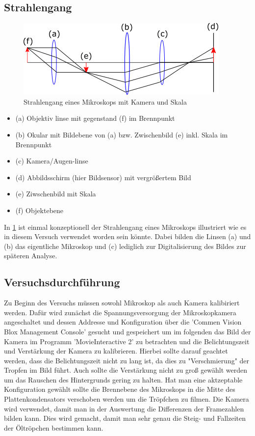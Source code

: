 \documentclass{scrartcl}
\begin{document}
	\subsection{Strahlengang}
		\begin{figure}[H]
            \centering
            \includegraphics[width=.5\textwidth]{mikroskop.png} 
			\caption{Strahlengang eines Mikroskops mit Kamera und Skala}
			\label{Mikroskop}  
        \end{figure}
        \begin{itemize}
            \item (a) Objektiv linse mit gegenstand (f) im Brennpunkt
            \item (b) Okular mit Bildebene von (a) bzw. Zwischenbild (e) inkl. Skala im Brennpunkt
            \item (c) Kamera/Augen-linse
            \item (d) Abbildsschirm (hier Bildsensor) mit vergrößertem Bild
            \item (e) Ziwschenbild mit Skala
            \item (f) Objektebene
        \end{itemize}
        In \ref{Mikroskop} ist einmal konzeptionell der Strahlengang eines Mikroskops illustriert wie es in diesem
        Versuch verwendet worden sein könnte. Dabei bilden die Linsen (a) und (b) das eigentliche Mikroskop und (c)
        lediglich zur Digitalisierung des Bildes zur späteren Analyse.

	\subsection{Versuchsdurchführung}
		Zu Beginn des Versuchs müssen sowohl Mikroskop als auch Kamera kalibiriert werden. Dafür wird zunächst die
		Spannungsversorgung der Mikroskopkamera angeschaltet und dessen Addresse und Konfiguration über die 'Commen Vision Blox Management Console'
		gesucht und gespeichert um im folgenden das Bild der Kamera im Programm 'MovieInteractive 2' zu betrachten
		und die Belichtungszeit und Verstärkung der Kamera zu kalibrieren. Hierbei sollte darauf geachtet werden, dass die 
		Belichtungszeit nicht zu lang ist, da dies zu "Verschmierung" der Tropfen im Bild führt. Auch sollte 
		die Verstärkung nicht zu groß gewählt werden um das Rauschen des Hintergrunds gering zu halten. Hat man 
		eine aktzeptable Konfiguration gewählt sollte die Brennebene des Mikroskops in die Mitte des Plattenkondensators
		verschoben werden um die Tröpfchen zu filmen. Die Kamera wird verwendet, damit man in der Auswertung die Differenzen
        der Framezahlen bilden kann. Dies wird gemacht, damit man sehr genau die Steig- und Fallzeiten der Öltröpchen bestimmen kann.
\end{document}
